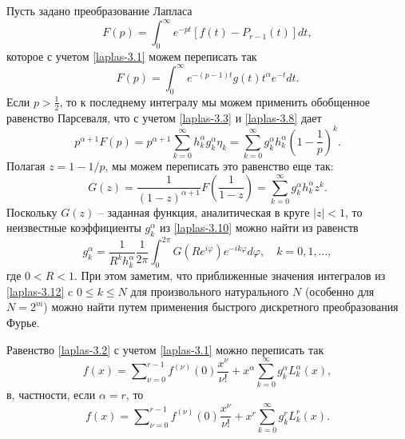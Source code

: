 Пусть задано преобразование Лапласа
\begin{equation}\label{laplas-3.8}
F(p)=\int_0^\infty e^{-pt}\left[f(t)-P_{r-1}(t)\right]dt,
\end{equation}
которое с учетом \eqref{laplas-3.1} можем переписать так
\begin{equation}\label{laplas-3.9}
F(p)=\int_0^\infty e^{-(p-1)t} g(t)t^\alpha e^{-t}dt.
\end{equation}
Если $p>\frac12$, то к последнему интегралу мы можем применить обобщенное равенство Парсеваля, что с учетом \eqref{laplas-3.3} и \eqref{laplas-3.8} дает
\begin{equation}\label{laplas-3.10}
p^{\alpha+1}F(p)=p^{\alpha+1}\sum_{k=0}^\infty h_k^\alpha g_k^\alpha\eta_k=\sum_{k=0}^\infty g_k^\alpha h_k^\alpha\left(1-\frac1p\right)^k.
\end{equation}
Полагая $z=1-1/p$, мы можем переписать это равенство еще так:
\begin{equation}\label{laplas-3.11}
G(z)=\frac{1}{(1-z)^{\alpha+1}}F\left(\frac{1}{1-z}\right)=\sum_{k=0}^\infty g_k^\alpha h_k^\alpha z^k.
\end{equation}
Поскольку  $G(z)$ -- заданная функция, аналитическая в круге $|z|<1$,  то неизвестные коэффициенты $g_k^\alpha$ из \eqref{laplas-3.10} можно найти из равенств
\begin{equation}\label{laplas-3.12}
g_k^\alpha=\frac{1}{R^{k} h_k^\alpha}\frac{1}{2\pi}\int_0^{2\pi}G(Re^{i\varphi})e^{-ik\varphi}d\varphi, \quad k=0,1,\ldots,
\end{equation}
где $0<R<1$. При этом заметим, что приближенные значения интегралов из \eqref{laplas-3.12} c $0\le k\le N $ для произвольного натурального $N$ (особенно для $N=2^m$) можно найти путем применения быстрого дискретного преобразования Фурье.

Равенство \eqref{laplas-3.2} с учетом \eqref{laplas-3.1} можно переписать  так
\begin{equation}\label{laplas-3.13}
f(x)=\sum\nolimits_{\nu=0}^{r-1}f^{(\nu)}(0)\frac{x^\nu}{\nu!}+x^\alpha\sum_{k=0}^{\infty} g_k^\alpha L_k^\alpha(x),
\end{equation}
в, частности, если  $\alpha=r$, то
\begin{equation}\label{laplas-3.14}
f(x)=\sum\nolimits_{\nu=0}^{r-1}f^{(\nu)}(0)\frac{x^\nu}{\nu!}+x^r\sum_{k=0}^{\infty} g_k^r L_k^r(x).
\end{equation}

